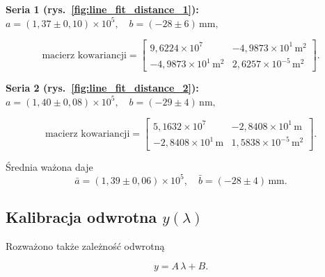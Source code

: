 \documentclass[12pt]{article}
\begin{document}
\textbf{Seria 1 (rys.~\ref{fig:line_fit_distance_1}):}  
\(a = (1{,}37 \pm 0{,}10) \times 10^{5}, \quad b = (-28 \pm 6)\,\mathrm{mm},\)

\[
  \text{macierz kowariancji} =
  \begin{bmatrix}
    9{,}6224 \times 10^{7} & -4{,}9873 \times 10^{1}\,\mathrm{m}^2 \\
    -4{,}9873\times 10^{1}\,\mathrm{m}^2 & 2{,}6257 \times 10^{-5}\,\mathrm{m}^2
  \end{bmatrix}.
\]

\textbf{Seria 2 (rys.~\ref{fig:line_fit_distance_2}):}  
\(a = (1{,}40 \pm 0{,}08) \times 10^{5}, \quad b = (-29 \pm 4)\,\mathrm{nm},\)

\[
  \text{macierz kowariancji} =
  \begin{bmatrix}
      5{,}1632 \times 10^{7} & -2{,}8408\times10^{1}\,\mathrm{m} \\
    -2{,}8408\times10^{1}\,\mathrm{m} & 1{,}5838\times10^{-5}\,\mathrm{m}^2
  \end{bmatrix}.
\]

Średnia ważona daje  
\[
  \bar{a} = (1{,}39 \pm 0{,}06) \times 10^{5}, \quad
  \bar{b} = (-28 \pm 4)\,\mathrm{mm}.
\]

\subsection*{Kalibracja odwrotna \(y(\lambda)\)}

Rozważono także zależność odwrotną  

\[
  y = A\,\lambda + B.
\]
\end{document}

